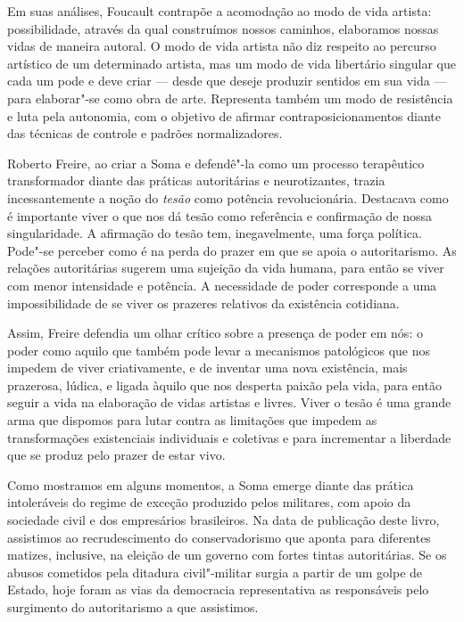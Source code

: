 Em suas análises, Foucault contrapõe a acomodação ao modo de vida
artista: possibilidade, através da qual construímos nossos caminhos,
elaboramos nossas vidas de maneira autoral. O modo de vida artista não
diz respeito ao percurso artístico de um determinado artista, mas um
modo de vida libertário singular que cada um pode e deve criar --- desde
que deseje produzir sentidos em sua vida --- para elaborar"-se como obra de
arte. Representa também um modo de resistência e luta pela autonomia,
com o objetivo de afirmar contraposicionamentos diante das técnicas de
controle e padrões normalizadores.

Roberto Freire, ao criar a Soma e defendê"-la como um processo
terapêutico transformador diante das práticas autoritárias e
neurotizantes, trazia incessantemente a noção do \emph{tesão} como
potência revolucionária. Destacava como é importante viver o que nos dá
tesão como referência e confirmação de nossa singularidade. A afirmação
do tesão tem, inegavelmente, uma força política. Pode"-se perceber como é
na perda do prazer em que se apoia o autoritarismo. As relações
autoritárias sugerem uma sujeição da vida humana, para então se viver
com menor intensidade e potência. A necessidade de poder corresponde a
uma impossibilidade de se viver os prazeres relativos da existência
cotidiana.

Assim, Freire defendia um olhar crítico sobre a presença de poder em
nós: o poder como aquilo que também pode levar a mecanismos patológicos
que nos impedem de viver criativamente, e de inventar uma nova
existência, mais prazerosa, lúdica, e ligada àquilo que nos desperta
paixão pela vida, para então seguir a vida na elaboração de vidas
artistas e livres. Viver o tesão é uma grande arma que dispomos para
lutar contra as limitações que impedem as transformações existenciais
individuais e coletivas e para incrementar a liberdade que se produz
pelo prazer de estar vivo.

Como mostramos em alguns momentos, a Soma emerge diante das prática
intoleráveis do regime de exceção produzido pelos militares, com apoio
da sociedade civil e dos empresários brasileiros. Na data de publicação
deste livro, assistimos ao recrudescimento do conservadorismo que aponta
para diferentes matizes, inclusive, na eleição de um governo com fortes
tintas autoritárias. Se os abusos cometidos pela ditadura civil"-militar
surgia a partir de um golpe de Estado, hoje foram as vias da democracia
representativa as responsáveis pelo surgimento do autoritarismo a que
assistimos.

